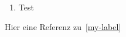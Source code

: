 \documentclass[11pt]{article}
\begin{document}
\begin{enumerate}
    \item Test \label{my-label}
\end{enumerate}

    Hier eine Referenz zu~\ref{my-label}
\end{document}

